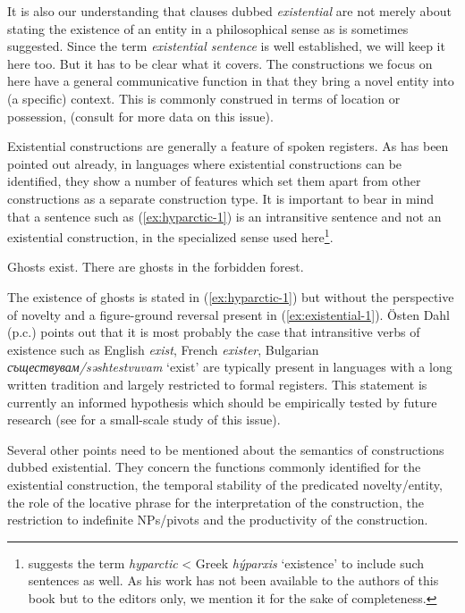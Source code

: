 \documentclass[output=paper,chinesefont,colorlinks,citecolor=brown]{langscibook}
\begin{document}
It is also our understanding that clauses dubbed \textit{existential} are not merely about stating the existence of an entity in a philosophical sense as is sometimes suggested. Since the term \textit{existential sentence} is well established, we will keep it here too. But it has to be clear what it covers. The constructions we focus on here have a general communicative function in that they bring a novel entity into (a specific) context. This is commonly construed in terms of location or possession, (consult  for more data on this issue). 

Existential constructions are generally a feature of spoken registers. As has been pointed out already, in languages where existential constructions can be identified, they show a number of features which set them apart from other constructions as a separate construction type. It is important to bear in mind that a sentence such as (\ref{ex:hyparctic-1}) is an intransitive sentence and not an existential construction, in the specialized sense used here\footnote{\citet{haspelmath2021} suggests the term \textit{hyparctic} < Greek \textit{hýparxis} ‘existence’ to include such sentences as well. As his work has not been available to the authors of this book but to the editors only, we mention it for the sake of completeness.}.

\begin{exe}
\ex \label{ex:hyparctic-1}
Ghosts exist.
\ex \label{ex:existential-1}
There are ghosts in the forbidden forest.
\end{exe}
The existence of ghosts is stated in (\ref{ex:hyparctic-1}) but without the perspective of novelty and a figure-ground reversal present in (\ref{ex:existential-1}). Östen Dahl (p.c.) points out that it is most probably the case that intransitive verbs of existence such as English \textit{exist}, French \textit{exister}, Bulgarian \textit{съществувам/səshtestvuvam} ‘exist’ are typically present in languages with a long written tradition and largely restricted to formal registers. This statement is currently an informed hypothesis which should be empirically tested by future research (see \citet{olssonExistentialConstructionsConstructions2022} for a small-scale study of this issue). 

Several other points need to be mentioned about the semantics of constructions dubbed existential. They concern the functions commonly identified for the existential construction, the temporal stability of the predicated novelty{\slash}entity, the role of the locative phrase for the interpretation of the construction, the restriction to indefinite NPs{\slash}pivots and the productivity of the construction.
\end{document}
